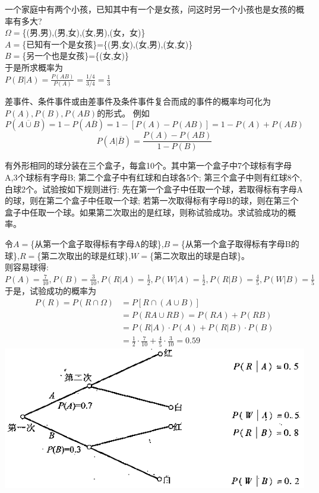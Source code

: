 \begin{frame}
\begin{example}
	一个家庭中有两个小孩，已知其中有一个是女孩，问这时另一个小孩也是女孩的概率有多大?\\
	$\Omega=$\{(男,男),(男,女),(女,男),(女，女)\}\\
	$A=$\{已知有一个是女孩\}=\{(男,女),(女,男),(女,女)\}\\
	$B=$\{另一个也是女孩\}=\{(女,女)\}\\
	于是所求概率为\\
	$P(B|A)=\frac{P(AB)}{P(A)}=\frac{1/4}{3/4}=\frac{1}{3}$
\end{example}
\end{frame}

\begin{frame}
差事件、条件事件或由差事件及条件事件复合而成的事件的概率均可化为$P(A),P(B),P(AB)$的形式。
例如
\[P(\overline{A\cup B})=1-P(A\overline{B})=1-[P(A)-P(AB)]=1-P(A)+P(AB) \]
\[P(A|\overline{B})=\frac{P(A)-P(AB)}{1-P(B)} \]
\begin{example}
	有外形相同的球分装在三个盒子，每盒10个。其中第一个盒子中7个球标有字母A,3个球标有字母B; 第二个盒子中有红球和白球各5个; 第三个盒子中则有红球8个,白球2个。试验按如下规则进行: 先在第一个盒子中任取一个球，若取得标有字母A的球，则在第二个盒子中任取一个球; 若第一次取得标有字母B的球，则在第三个盒子中任取一个球。如果第二次取出的是红球，则称试验成功。求试验成功的概率。
\end{example}
\end{frame}

\begin{frame}
\begin{solution}
	令$A=$\{从第一个盒子取得标有字母A的球\},$B=$\{从第一个盒子取得标有字母B的球\},$R=$\{第二次取出的球是红球\},$W=$\{第二次取出的球是白球\}。\\
	则容易球得: $P(A)=\frac{7}{10}, P(B)=\frac{3}{10}, P(R|A)=\frac{1}{2},P(W|A)=\frac{1}{2},P(R|B)=\frac{4}{5},P(W|B)=\frac{1}{5}$\\
	于是，试验成功的概率为
	\begin{align*}
	P(R)=P(R\cap\Omega)&=P[R\cap(A\cup B)]\\
	&=P(RA\cup RB)=P(RA)+P(RB)\\
	&=P(R|A)\cdot P(A)+P(R|B)\cdot P(B)\\
	&=\frac{1}{2}\cdot\frac{7}{10}+\frac{4}{5}\cdot\frac{3}{10}=0.59
	\end{align*}
	\includegraphics[scale=0.18]{tree}
\end{solution}
\end{frame}

